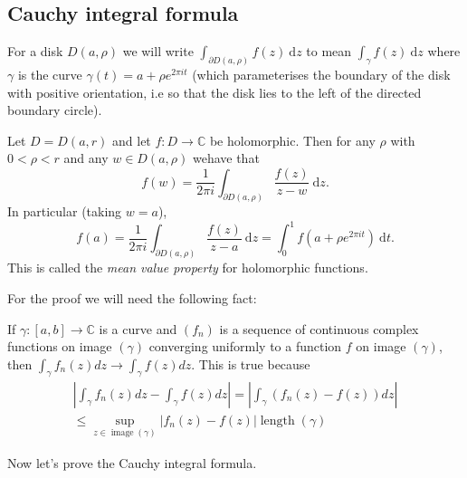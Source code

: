 \documentclass[egregdoesnotlikesansseriftitles,a4paper]{scrartcl}
\begin{document}
\subsection{Cauchy integral formula}
\begin{notation}
     For a disk $D (a,\rho)$ we will write $\int_{ \partial D (a, \rho)}^{}f (z) \ \mathrm{d}z $ to mean $\int_{\gamma}^{}f (z) \ \mathrm{d}z $ where $\gamma$ is the curve $\gamma (t)=a+\rho e^{2\pi i t}$ (which parameterises the boundary of the disk with positive orientation, i.e so that the disk lies to the left of the directed boundary circle). 
\end{notation}
\begin{theorem}
      Let $D=D (a,r)$ and let $f: D \rightarrow \mathbb{C}$ be holomorphic. Then for any $\rho$ with $0 < \rho< r$ and any $w \in D (a, \rho)$ wehave that \[
      f (w)=\frac{1}{2\pi i} \int_{ \partial D (a, \rho)}^{} \frac{f (z)}{z-w} \ \mathrm{d}z
      .\] In particular (taking $w=a$), \[
          f (a)=\frac{1}{2\pi i} \int_{ \partial D (a, \rho)}^{} \frac{f (z)}{z-a} \ \mathrm{d}z= \int_{0}^{1}f (a+ \rho e^{2\pi it}) \ \mathrm{d}t 
      .\] This is called the \emph{mean value property} for holomorphic functions.
\end{theorem}
For the proof we will need the following fact:
\begin{lemma}
      If $\gamma: [a,b] \rightarrow \mathbb{C}$ is a curve and $\left(f_{n}\right)$ is a sequence of continuous complex functions on image $(\gamma)$ converging uniformly to a function $f$ on image $(\gamma)$, then $\int_{\gamma} f_{n}(z) d z \rightarrow \int_{\gamma} f(z) d z$.
      This is true because
      $$
      \begin{array}{r}
      \left|\int_{\gamma} f_{n}(z) d z-\int_{\gamma} f(z) d z\right|=\left|\int_{\gamma}\left(f_{n}(z)-f(z)\right) d z\right| \\
      \leq \sup _{z \in \operatorname{image}(\gamma)}\left|f_{n}(z)-f(z)\right| \operatorname{length}(\gamma)
      \end{array}
      $$
\end{lemma}
Now let's prove the Cauchy integral formula.
\end{document}
